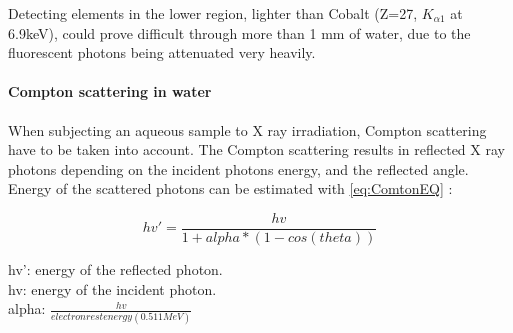 Detecting elements in the lower region, lighter than Cobalt (Z=27, $K_{\alpha 1}$ at 6.9keV), could prove difficult through more than 1 mm of water, due to the fluorescent photons being attenuated very heavily. 


\paragraph{Compton scattering in water}
When subjecting an aqueous sample to X ray irradiation, Compton scattering have to be taken into account. The Compton scattering results in reflected X ray photons depending on the incident photons energy, and the reflected angle. Energy of the scattered photons can be estimated with \ref{eq:ComtonEQ} \citep{ComptonScatt}:

\begin{equation}
\label{eq:ComtonEQ}
hv' =  \frac{hv}{ 1+alpha*(1-cos(theta)) }
\end{equation}

\noindent hv': energy of the reflected photon.\\
hv: energy of the incident photon.\\
alpha: $\frac{hv}{electron rest energy (0.511MeV)}$ \\
 





